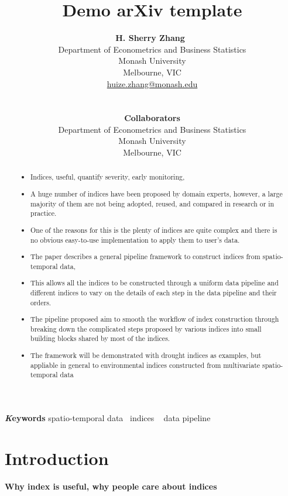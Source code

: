 \documentclass[
]{article}
\title{Demo arXiv template}
\author{
\textbf{H. Sherry Zhang}~\orcidlink{0000-0002-7122-1463}\\Department of
Econometrics and Business Statistics\\Monash University\\Melbourne,
VIC\\\href{mailto:huize.zhang@monash.edu}{huize.zhang@monash.edu}\\\\\\
\textbf{Collaborators}\\Department of Econometrics and Business
Statistics\\Monash University\\Melbourne, VIC\\}
\date{}
\providecommand{\tightlist}{%
  \setlength{\itemsep}{0pt}\setlength{\parskip}{0pt}}\usepackage{longtable,booktabs,array}
\begin{document}
\maketitle
\begin{abstract}
\begin{itemize}
\tightlist
\item
  Indices, useful, quantify severity, early monitoring,
\item
  A huge number of indices have been proposed by domain experts,
  however, a large majority of them are not being adopted, reused, and
  compared in research or in practice.
\item
  One of the reasons for this is the plenty of indices are quite complex
  and there is no obvious easy-to-use implementation to apply them to
  user's data.
\item
  The paper describes a general pipeline framework to construct indices
  from spatio-temporal data,
\item
  This allows all the indices to be constructed through a uniform data
  pipeline and different indices to vary on the details of each step in
  the data pipeline and their orders.
\item
  The pipeline proposed aim to smooth the workflow of index construction
  through breaking down the complicated steps proposed by various
  indices into small building blocks shared by most of the indices.
\item
  The framework will be demonstrated with drought indices as examples,
  but appliable in general to environmental indices constructed from
  multivariate spatio-temporal data
\end{itemize}
\end{abstract}
{\bfseries \emph Keywords}
\def\sep{\textbullet\ }
spatio-temporal data \sep indices \sep 
data pipeline

\ifdefined\Shaded\renewenvironment{Shaded}{\begin{tcolorbox}[breakable, frame hidden, sharp corners, boxrule=0pt, borderline west={3pt}{0pt}{shadecolor}, enhanced, interior hidden]}{\end{tcolorbox}}\fi

\newpage

\hypertarget{introduction}{%
\section{Introduction}\label{introduction}}

\textbf{Why index is useful, why people care about indices}
\end{document}
